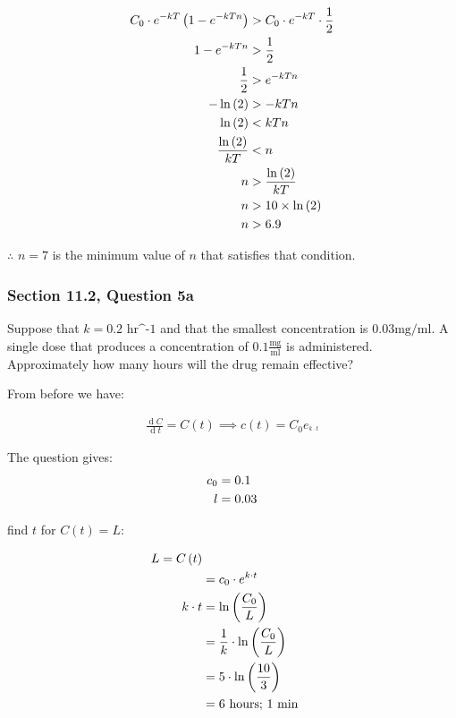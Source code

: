 \begin{align}
  C_0\cdot  e^{- kT}\left( 1- e^{- kTn} \right)  &> C_0\cdot  e^{- kT} \cdot  \frac{1}{2}\notag \\ 
  1- e^{- kTn}&>\frac{1}{2} \notag \\ 
  \frac{1}{2}&>e^{- kTn} \notag \\ 
  -\ln{ \left( 2 \right) } &> - kTn\notag \\ 
  \ln{ \left( 2 \right) }&<kTn\notag \\ 
  \frac{\ln{ \left( 2 \right) }}{kT} &< n\notag \\ 
  n&>\frac{\ln{ \left( 2 \right) }}{kT}\notag \\ 
  n&>10\times \ln{ \left( 2 \right) } \notag \\ 
  n&>6.9
\end{align}

$\therefore$  $n = 7$ is the minimum value of  $n$ that satisfies that condition.





\subsubsection{Section 11.2, Question 5a}

  Suppose that $k= 0.2 \text{ hr^{-1}}$ and that the smallest concentration is $0.03 \text{mg}/\text{ml}$. A single dose that produces a concentration of $ 0.1 \frac{\text{mg}}{\text{ml}}$  is administered. Approximately how many hours will the drug remain effective?

  From before we have:

  \begin{align*}
    \frac{\operatorname{d}C }{\operatorname{d} t}= C\left( t \right)  \implies  c\left( t \right)= C_0e_^{k\cdot  t}
  \end{align*}

 The question gives:
 \begin{align}
   c_0&= 0.1 \notag \\ 
   l&= 0.03
 \end{align}

 find $t$ for $C\left( t \right)= L$:

$$
\begin{align*}
L= C\left( t \right)\notag \\ 
&= c_0\cdot  e^{k\cdot  t}\notag \\ 
k\cdot  t &=  \ln{ \left( \frac{C_0}{L} \right) }\\
&= \frac{1}{k}\cdot  \ln{ \left( \frac{C_0}{L} \right) }\\
&= 5\cdot  \ln{ \left( \frac{10}{3} \right) }\\
&= 6 \text{ hours; } 1 \text{ min }
\end{align*}
$$


